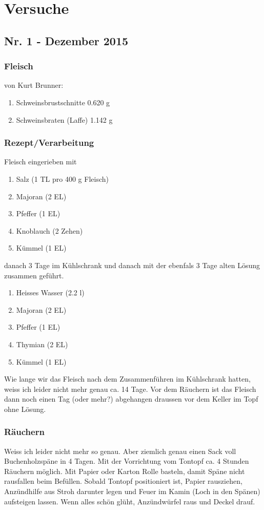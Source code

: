\section{Versuche}
\subsection{Nr. 1 - Dezember 2015}
\subsubsection*{Fleisch}
von Kurt Brunner:
\begin{enumerate}
\item Schweinsbrustschnitte 0.620 g
\item Schweinsbraten (Laffe) 1.142 g
\end{enumerate}
%
\subsubsection*{Rezept/Verarbeitung}
Fleisch eingerieben mit
\begin{enumerate}
\item Salz (1 TL pro 400 g Fleisch)
\item Majoran (2 EL)
\item Pfeffer (1 EL)
\item Knoblauch (2 Zehen)
\item Kümmel 	(1 EL)
\end{enumerate}
danach 3 Tage im Kühlschrank und danach mit der ebenfals 3 Tage alten Lösung zusammen geführt.
\begin{enumerate}
\item Heisses Wasser (2.2 l)
\item Majoran (2 EL)
\item Pfeffer (1 EL)
\item Thymian (2 EL)
\item Kümmel 	(1 EL)
\end{enumerate}
Wie lange wir das Fleisch nach dem Zusammenführen im Kühlschrank hatten, weiss ich leider nicht mehr genau ca. 14 Tage.
Vor dem Räuchern ist das Fleisch dann noch einen Tag (oder mehr?) abgehangen draussen vor dem Keller im Topf ohne Lösung.

\subsubsection*{Räuchern}
Weiss ich leider nicht mehr so genau.
Aber ziemlich genau einen Sack voll Buchenholzspäne in 4 Tagen.
Mit der Vorrichtung vom Tontopf ca. 4 Stunden Räuchern möglich. Mit Papier oder Karton Rolle basteln, damit Späne nicht rausfallen beim Befüllen. Sobald Tontopf positioniert ist, Papier rausziehen, Anzündhilfe aus Stroh darunter legen und Feuer im Kamin (Loch in den Spänen) aufsteigen lassen. Wenn alles schön glüht, Anzündwürfel raus und Deckel drauf.



